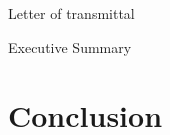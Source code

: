 \documentclass[12pt]{article}
\begin{document}
    Letter of transmittal

    \pagebreak

    

    Executive Summary

    \pagebreak

    \tableofcontents

    \pagebreak

    

    

    \pagebreak

    \section{Conclusion}

    \pagebreak

    
\end{document}
